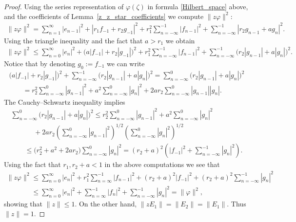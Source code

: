 \documentclass[pdftex]{sigma}
\numberwithin{equation}{section}
\begin{document}
\begin{proof}
Using the series representation of $\varphi(\zeta)$ in formula \eqref{Hilbert_space} above, and the coef\/f\/icients of
Lemma~\ref{z_z_star_coefficients} we compute $\|z\varphi\|^2$:
\begin{gather*}
\|z\varphi\|^2=\sum\limits_{n=1}^\infty |e_{n-1}|^2+|r_1f_{-1}+r_2g_{-1}|^2+r_1^2\sum\limits_{n=-\infty}^{-1}
|f_{n-1}|^2+\sum\limits_{n=-\infty}^{-1}|r_2g_{n-1}+ag_n|^2.
\end{gather*}
Using the triangle inequality and the fact that $a> r_1$ we obtain
\begin{gather*}
\|z\varphi\|^2 \le \sum\limits_{n=0}^\infty |e_n|^2+\big(a|f_{-1}|+r_2|g_{-1}|\big)^2+r_1^2
\sum\limits_{n=-\infty}^{-1}|f_{n-1}|^2+\sum\limits_{n=-\infty}^{-1}\big(r_2|g_{n-1}|+a|g_n|\big)^2.
\end{gather*}
Notice that by denoting $g_0:= f_{-1}$ we can write
\begin{gather*}
\big(a|f_{-1}|+r_2|g_{-1}|\big)^2+\sum\limits_{n=-\infty}^{-1}\big(r_2|g_{n-1}|+a|g_n|\big)^2=
\sum\limits_{n=-\infty}^{0}\big(r_2|g_{n-1}|+a|g_n|\big)^2
\\
\qquad{}
=r_2^2 \sum\limits_{n=-\infty}^0 |g_{n-1}|^2+ a^2\sum\limits_{n=-\infty}^0 |g_n|^2+2ar_2 \sum\limits_{n=-\infty}^0
|g_{n-1}||g_n|.
\end{gather*}
The Cauchy--Schwartz inequality implies
\begin{gather*}
\sum\limits_{n=-\infty}^{0}\big(r_2|g_{n-1}|+a|g_n|\big)^2   \leq r_2^2 \sum\limits_{n=-\infty}^0 |g_{n-1}|^2+
a^2\sum\limits_{n=-\infty}^0 |g_n|^2
\\
\qquad
\phantom{\leq}  {}
+2ar_2 \left(\sum\limits_{n=-\infty}^0 |g_{n-1}|^2\right)^{1/2}\left(\sum\limits_{n=-\infty}^0 |g_n|^2\right)^{1/2}
\\
\qquad
\leq \big(r_2^2+a^2+2ar_2\big) \sum\limits_{n=-\infty}^0 |g_n|^2 =(r_2+a)^2 \left(|f_{-1}|^2+\sum\limits_{n=-\infty}^{-1} |g_n|^2\right).
\end{gather*}
Using the fact that $r_1, r_2+a <1$ in the above computations we see that
\begin{gather*}
\|z\varphi\|^2  \le \sum\limits_{n=0}^\infty |e_n|^2+r_1^2\sum\limits_{n=\infty}^{-1}|f_{n-1}|^2+(r_2+a)^2
|f_{-1}|^2+(r_2+a)^2\sum\limits_{n=-\infty}^{-1}|g_n|^2
\\
\phantom{\|z\varphi\|^2}{}
 \leq \sum\limits_{n=0}^\infty |e_n|^2+\sum\limits_{n=\infty}^{-1}|f_n|^2+\sum\limits_{n=-\infty}^{-1}|g_n|^2 =
\|\varphi\|^2,
\end{gather*}
showing that $\|z\|\le 1$.
On the other hand, $\|zE_1\| =\| E_2\|=\|E_1\|$.
Thus $\|z\|=1$.
\end{proof}
\end{document}
